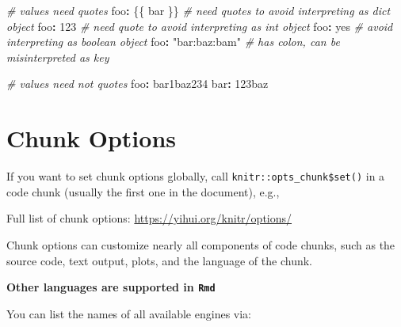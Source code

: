 \documentclass[
]{book}
\newenvironment{Shaded}{\begin{snugshade}}{\end{snugshade}}
\newcommand{\CommentTok}[1]{\textcolor[rgb]{0.56,0.35,0.01}{\textit{#1}}}
\newcommand{\DecValTok}[1]{\textcolor[rgb]{0.00,0.00,0.81}{#1}}
\newcommand{\InformationTok}[1]{\textcolor[rgb]{0.56,0.35,0.01}{\textbf{\textit{#1}}}}
\newcommand{\NormalTok}[1]{#1}
\newcommand{\SpecialCharTok}[1]{\textcolor[rgb]{0.81,0.36,0.00}{\textbf{#1}}}
\newcommand{\StringTok}[1]{\textcolor[rgb]{0.31,0.60,0.02}{#1}}
\begin{document}
\begin{Shaded}
\begin{Highlighting}[]
\CommentTok{\# values need quotes}
\NormalTok{foo}\SpecialCharTok{:} \StringTok{\textquotesingle{}\{\{ bar \}\}\textquotesingle{}} \CommentTok{\# need quotes to avoid interpreting as \textasciigrave{}dict\textasciigrave{} object}
\NormalTok{foo}\SpecialCharTok{:} \StringTok{\textquotesingle{}123\textquotesingle{}}       \CommentTok{\# need quote to avoid interpreting as \textasciigrave{}int\textasciigrave{} object}
\NormalTok{foo}\SpecialCharTok{:} \StringTok{\textquotesingle{}yes\textquotesingle{}}           \CommentTok{\# avoid interpreting as \textasciigrave{}boolean\textasciigrave{} object}
\NormalTok{foo}\SpecialCharTok{:} \StringTok{"bar:baz:bam"} \CommentTok{\# has colon, can be misinterpreted as key}

\CommentTok{\# values need not quotes}
\NormalTok{foo}\SpecialCharTok{:}\NormalTok{ bar1baz234}
\NormalTok{bar}\SpecialCharTok{:} \DecValTok{123}\NormalTok{baz}
\end{Highlighting}
\end{Shaded}

\section{Chunk Options}\label{chunk-options}

If you want to set chunk options globally, call \texttt{knitr::opts\_chunk\$set()} in a code chunk (usually the first one in the document), e.g.,

\begin{Shaded}
\end{Shaded}

Full list of chunk options: \url{https://yihui.org/knitr/options/}

Chunk options can customize nearly all components of code chunks, such as the source code, text output, plots, and the language of the chunk.

\textbf{Other languages are supported in \texttt{Rmd}}

You can list the names of all available engines via:
\end{document}
